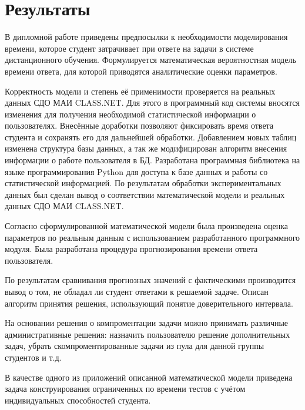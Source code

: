  \section{Результаты}
 \label{ch5}

В дипломной работе приведены предпосылки к необходимости модели\-рования времени, которое студент затрачивает при ответе на задачи в системе дистанционного обучения. Формулируется математическая вероятностная мо\-дель времени ответа, для которой приводятся аналитические оценки пара\-метров.

Корректность модели и степень её применимости проверяется на реальных данных СДО МАИ CLASS.NET. Для этого в программный код системы вносятся изменения для получения необходимой статистической информации о пользователях. Внесённые доработки позволя\-ют фиксировать время ответа студента и сохранять его для дальнейшей обработки. Добавлением новых таблиц изменена структура базы данных, а так же модифицирован алго\-ритм внесения информации о работе пользователя в БД. Разработана программная библиотека на языке программирования Python для доступа к базе данных и работы со статистической информацией. По результатам обработки экспе\-риментальных данных был сделан вывод о соот\-ветствии математической мо\-дели и реальных данных СДО МАИ CLASS.NET.

Согласно сформулированной математической модели была произведена оценка параметров по реальным данным с использованием разработанного программного модуля. Была разработана процедура прогнозирования вре\-мени ответа пользователя.

По результатам сравнивания прогнозных значений с фак\-тическими про\-изводится вывод о том, не обладал ли студент ответами к решаемой задаче. Описан алгоритм принятия решения, использующий понятие доверительного интервала.

На основании решения о компроментации задачи можно принимать раз\-личные административные решения: назначить пользователю решение до\-полнительных задач, убрать скомпроментированные задачи из пула для дан\-ной группы студентов и т.д.

В качестве одного из приложений описанной математической модели при\-ведена задача конструирования ограниченных по времени тестов с учётом индивидуальных способностей студента.